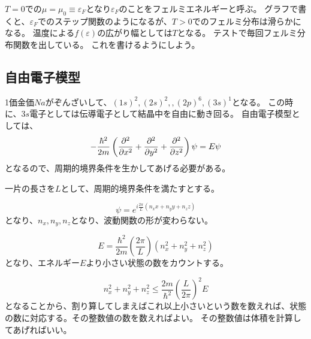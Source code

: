 \documentclass[titlepage]{ltjsarticle}
\begin{document}
\(T=0\)での\(\mu=\mu_0\equiv \varepsilon_F\)となり\(\varepsilon_F\)のことをフェルミエネルギーと呼ぶ。
グラフで書くと、\(\varepsilon_F\)でのステップ関数のようになるが、\(T>0\)でのフェルミ分布は滑らかになる。
温度による\(f(\varepsilon)\)の広がり幅としては\(T \)となる。
テストで毎回フェルミ分布関数を出している。
これを書けるようにしよう。

\subsection{自由電子模型}
1価金価\(Na\)がぞんざいして、\((1s)^2,(2s)^2,,(2p)^6,(3s)^1\)となる。
この時に、\(3s\)電子としては伝導電子として結晶中を自由に動き回る。
自由電子模型としては、
\begin{equation}
  -\frac{\hbar^2}{2m}\left( \pdv[order=2]{}{x} + \pdv[order=2]{}{y} + \pdv[order=2]{}{z} \right) \psi = E \psi 
\end{equation}
となるので、周期的境界条件を生かしてあげる必要がある。

一片の長さを\(L\)として、周期的境界条件を満たすとする。

\begin{equation}
  \psi = e^{i \frac{2\pi}{L}(n_x x + n_y y + n_z z)}
\end{equation}
となり、\(n_x,n_y,n_z\)となり、波動関数の形が変わらない。

\begin{equation}
  E = \frac{\hbar^2}{2m} \left( \frac{2\pi}{L} \right)(n_x^2+n_y^2+n_z^2)
\end{equation}
となり、エネルギー\(E\)より小さい状態の数をカウントする。

\begin{equation}
  n_x^2 + n_y^2 + n_z^2 \leq \frac{2m}{\hbar^2}\left( \frac{L}{2\pi} \right)^2 E 
\end{equation}
となることから、割り算してしまえばこれ以上小さいという数を数えれば、状態の数に対応する。その整数値の数を数えればよい。
その整数値は体積を計算してあげればいい。
\end{document}
